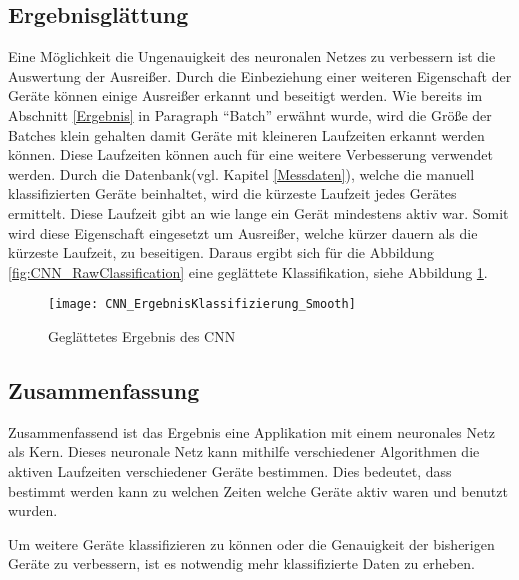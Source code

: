     \subsection{Ergebnisglättung}
        Eine Möglichkeit die Ungenauigkeit des neuronalen Netzes zu verbessern ist die Auswertung der Ausreißer.
        Durch die Einbeziehung einer weiteren Eigenschaft der Geräte können einige Ausreißer erkannt und beseitigt werden.
        Wie bereits im Abschnitt \ref{Ergebnis} in Paragraph "`Batch"' erwähnt wurde, wird die Größe der Batches klein gehalten damit Geräte mit kleineren Laufzeiten erkannt werden können.
        Diese Laufzeiten können auch für eine weitere Verbesserung verwendet werden.
        Durch die Datenbank(vgl. Kapitel \ref{Messdaten}), welche die manuell klassifizierten Geräte beinhaltet, wird die kürzeste Laufzeit jedes Gerätes ermittelt.
        Diese Laufzeit gibt an wie lange ein Gerät mindestens aktiv war.
        Somit wird diese Eigenschaft eingesetzt um Ausreißer, welche kürzer dauern als die kürzeste Laufzeit, zu beseitigen.
        Daraus ergibt sich für die Abbildung \ref{fig:CNN_RawClassification} eine geglättete Klassifikation, siehe Abbildung \ref{fig:CNN_SmoothClassification}.

        \begin{figure}[H]
            \centering
            \texttt{[image: CNN\_ErgebnisKlassifizierung\_Smooth]}
            \caption{Geglättetes Ergebnis des CNN}
            \label{fig:CNN_SmoothClassification}
        \end{figure}
    
    \subsection{Zusammenfassung}
        Zusammenfassend ist das Ergebnis eine Applikation mit einem neuronales Netz als Kern. 
        Dieses neuronale Netz kann mithilfe verschiedener Algorithmen die aktiven Laufzeiten verschiedener Geräte bestimmen.
        Dies bedeutet, dass bestimmt werden kann zu welchen Zeiten welche Geräte aktiv waren und benutzt wurden.
        
        Um weitere Geräte klassifizieren zu können oder die Genauigkeit der bisherigen Geräte zu verbessern, ist es notwendig mehr klassifizierte Daten zu erheben.